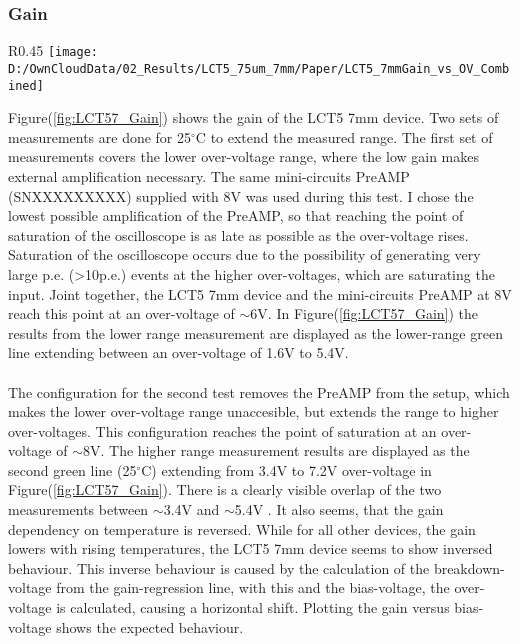 \documentclass[12pt,article,type=msc,colorback,accentcolor=tud9c]{tudthesis}
\begin{document}
\newpage
\subsubsection{Gain}
\label{subsubsec:LCT57Gain}
\begin{wrapfigure}{R}{0.45\textwidth}
\centering
\texttt{[image: D:/OwnCloudData/02\_Results/LCT5\_75um\_7mm/Paper/LCT5\_7mmGain\_vs\_OV\_Combined]}
\caption{\label{fig:LCT57_Gain}Gain of the HPK LCT5 7mm pixel}
\end{wrapfigure}
Figure(\ref{fig:LCT57_Gain}) shows the gain of the LCT5 7mm device. Two sets of measurements are done for 25$^\circ$C to extend the measured range. The first set of measurements covers the lower over-voltage range, where the low gain makes external amplification necessary. The same mini-circuits PreAMP (SNXXXXXXXXX) supplied with 8V was used during this test. I chose the lowest possible amplification of the PreAMP, so that reaching the point of saturation of the oscilloscope is as late as possible as the over-voltage rises. Saturation of the oscilloscope occurs due to the possibility of generating very large p.e. (>10p.e.) events at the higher over-voltages, which are saturating the input. Joint together, the LCT5 7mm device and the mini-circuits PreAMP at 8V reach this point at an over-voltage of $\sim$6V. In Figure(\ref{fig:LCT57_Gain}) the results from the lower range measurement are displayed as the lower-range green line extending between an over-voltage of 1.6V to 5.4V.
\\\\
The configuration for the second test removes the PreAMP from the setup, which makes the lower over-voltage range unaccesible, but extends the range to higher over-voltages. This configuration reaches the point of saturation at an over-voltage of $\sim$8V. The higher range measurement results are displayed as the second green line (25$^\circ$C) extending from 3.4V to 7.2V over-voltage in Figure(\ref{fig:LCT57_Gain}). There is a clearly visible overlap of the two measurements between $\sim$3.4V and $\sim$5.4V . It also seems, that the gain dependency on temperature is reversed. While for all other devices, the gain lowers with rising temperatures, the LCT5 7mm device seems to show inversed behaviour. This inverse behaviour is caused by the calculation of the breakdown-voltage from the gain-regression line, with this and the bias-voltage, the over-voltage is calculated, causing a horizontal shift. Plotting the gain versus bias-voltage shows the expected behaviour.
\end{document}
